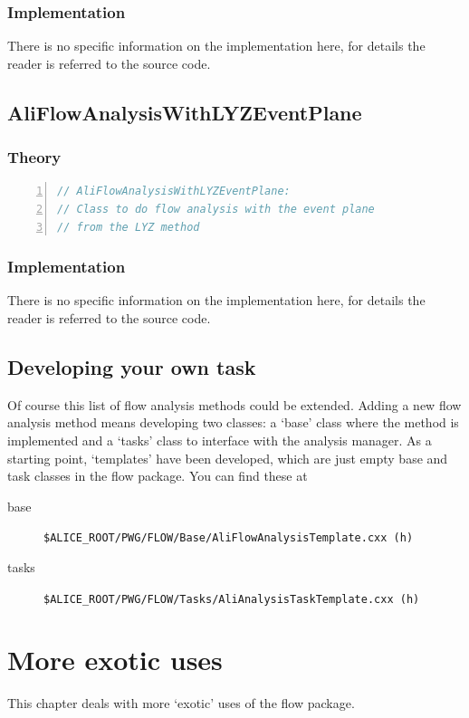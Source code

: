 \documentclass[a4paper]{book}
\numberwithin{equation}{subsection}
\begin{document}
\subsection{Implementation}
There is no specific information on the implementation here, for details the reader is referred to the source code.

\section{AliFlowAnalysisWithLYZEventPlane}
\subsection{Theory}
\begin{lstlisting}[language=C, numbers=left]
// AliFlowAnalysisWithLYZEventPlane:
// Class to do flow analysis with the event plane
// from the LYZ method
\end{lstlisting}
\subsection{Implementation}
There is no specific information on the implementation here, for details the reader is referred to the source code.

\section{Developing your own task}
Of course this list of flow analysis methods could be extended. Adding a new flow analysis method means developing two classes: a `base' class where the method is implemented and a `tasks' class to interface with the analysis manager. As a starting point, `templates' have been developed, which are just empty base and task classes in the flow package. You can find these at
\begin{description}
\item[base] \texttt{\$ALICE\_ROOT/PWG/FLOW/Base/AliFlowAnalysisTemplate.cxx (h)}
\item[tasks] \texttt{\$ALICE\_ROOT/PWG/FLOW/Tasks/AliAnalysisTaskTemplate.cxx (h)}
\end{description}
	
		
\chapter{More exotic uses}\label{sec:exotic}
This chapter deals with more `exotic' uses of the flow package. 
\end{document}
